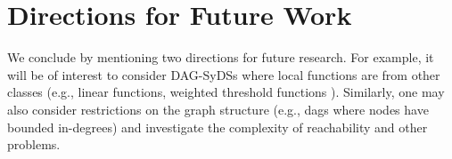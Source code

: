\section{Directions for  Future Work}
\label{sec:concl}
 
We conclude by mentioning two directions for future research.
For example, it will be of interest to consider 
DAG-SyDSs where local functions are from other classes
(e.g., linear functions, weighted threshold functions \cite{Crama-Hammer-2011}).
Similarly, one may also consider restrictions
on the graph structure (e.g., dags where nodes have
bounded in-degrees) and investigate 
the complexity of reachability and other problems.


\iffalse
\noindent
\paragraph{Conclusions.}


\paragraph{Open Questions.}

\begin{itemize}
\item For DAG linear SyDSs, how long can a phase space cycle and transient be,
as a function of depth.

\item For bounded degree DAG  SyDSs, how long can a phase space cycle and transient be,
as a function of depth.

\item For various classes of Boolean functions of interest, 
how long can a phase space cycle and transient be?
(If they are polynomially bounded as a function of the number of nodes,
then reachability is polynomially solvable.)
\end{itemize}
\fi
